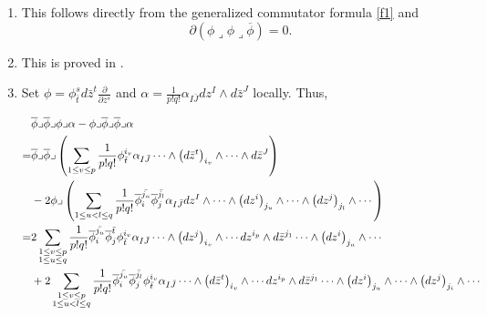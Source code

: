 \documentclass[12pt]{amsart}
\numberwithin{equation}{section}
\newcommand{\dz}{d \bar{z}}
\newcommand{\w}{\wedge}
\renewcommand{\1}{\mathds{1}}
\newcommand{\lc}{\lrcorner}
\newcommand{\lk}{\left(}
\newcommand{\rk}{\right)}
\renewcommand{\>}{\rightarrow}
\newcommand{\p}{\partial}
\def\p{\partial}
\def\w{\wedge}
\begin{document}
\begin{enumerate}
\item \quad This follows directly from the generalized commutator formula \eqref{f1} and $$\p(\phi
\lc \phi \lc \overline{\phi}) = 0.$$



\item \quad This is proved in \cite[Appendix B]{C}.



\item \quad Set $\phi = \phi^s_{\bar{t}} \dz^t \frac{\p}{\p z^s}$ and
$\alpha=\frac{1}{p!q!} \alpha_{I \bar{J}} dz^{I} \w \dz^{J}$
locally.  Thus,

$\begin{aligned} & \overline{\phi} \lc \overline{\phi} \lc \phi \lc
\alpha -
\phi \lc \overline{\phi} \lc \overline{\phi} \lc \alpha \\
=& \overline{\phi} \lc \overline{\phi} \lc \lk \sum_{1 \leq v \leq
p} \frac{1}{p!q!}\phi^{i_v}_{\bar{t}} \alpha_{I\bar{J}}
\cdots \w \big(\dz^t\big)_{i_v} \w \cdots \w \dz^{J} \rk\\
&- 2\phi \lc \lk \sum_{1 \leq u < l \leq q} \frac{1}{p!q!}
\overline{\phi}^{\bar{j_u}}_i \overline{\phi}^{\bar{j_l}}_j
\alpha_{I\bar{J}} dz^{I} \w \cdots \w \big(dz^i\big)_{j_u} \w
\cdots \w \big(dz^j\big)_{j_l} \w \cdots \rk \\
=& 2 \sum_{\begin{subarray}{c} 1 \leq v \leq p \\ 1 \leq u \leq q
\end{subarray}} \frac{1}{p!q!} \overline{\phi}^{\bar{j_u}}_i
\overline{\phi}^{\bar{t}}_{j} \phi^{i_v}_{\bar{t}} \alpha_{I\bar{J}}
\cdots \w \big(dz^j\big)_{i_v} \w \cdots
dz^{i_p} \w \dz^{j_1} \cdots \w \big(dz^{i}\big)_{j_u} \w \cdots \\
& +2 \sum_{\begin{subarray}{c} 1 \leq v \leq p\\ 1 \leq u < l \leq q
\end{subarray}} \frac{1}{p!q!} \overline{\phi}^{\bar{j_u}}_i
\overline{\phi}^{\bar{j_l}}_j \phi^{i_v}_{\bar{t}} \alpha_{I\bar{J}}
\cdots \w \big(\dz^t\big)_{i_v} \w \cdots dz^{i_p} \w \dz^{j_1}
\cdots \w \big(dz^i\big)_{j_u} \w \cdots
\w \big(dz^j\big)_{j_i} \w \cdots \\
\end{aligned}$


\end{enumerate}
\end{document}
